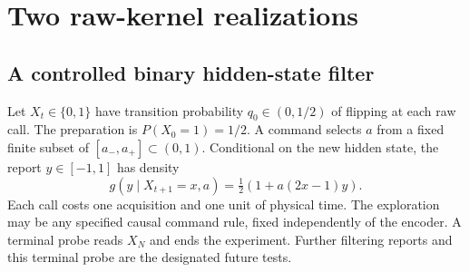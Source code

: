 \section{Two raw-kernel realizations}\label{sec:realizations}
\subsection{A controlled binary hidden-state filter}\label{sec:filter}
Let $X_t\in\{0,1\}$ have transition probability $q_0\in(0,1/2)$ of flipping at each raw call. The preparation is $P(X_0=1)=1/2$. A command selects $a$ from a fixed finite subset of $[a_-,a_+]\subset(0,1)$. Conditional on the new hidden state, the report $y\in[-1,1]$ has density
\begin{equation}\label{eq:hmm-kernel}
 g(y\mid X_{t+1}=x,a)=\tfrac12(1+a(2x-1)y).
\end{equation}
Each call costs one acquisition and one unit of physical time. The exploration may be any specified causal command rule, fixed independently of the encoder. A terminal probe reads $X_N$ and ends the experiment. Further filtering reports and this terminal probe are the designated future tests.


